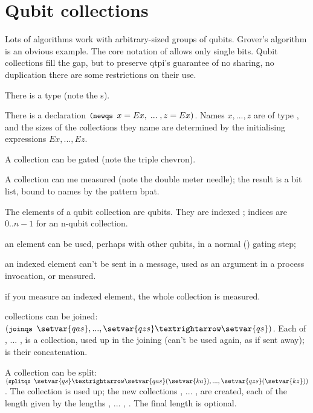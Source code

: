 
\chapter{Qubit collections}

Lots of algorithms work with arbitrary-sized groups of qubits. Grover's algorithm is an obvious example. The core notation of  allows only single bits. Qubit collections fill the gap, but to preserve qtpi's guarantee of no sharing, no duplication there are some restrictions on their use.

\begin{itemize*}
\item There is a type  (note the s).
\item There is a declaration $\texttt{\small{}(newqs } x=Ex, \;...\; ,z=Ex )$. Names $x, ... ,z$ are of type , and the sizes of the collections they name are determined by the initialising expressions $Ex, ..., Ez$.
\item A collection can be gated  (note the triple chevron).
\item A collection can me measured  (note the double meter needle); the result is a bit list, bound to names by the pattern bpat.
\item The elements of a qubit collection are qubits. They are indexed ; indices are $0..n-1$ for an n-qubit collection. 
\begin{itemize*}
\item an element can be used, perhaps with other qubits, in a normal (\verbtt{>>}) gating step;
\item an indexed element can't be sent in a message, used as an argument in a process invocation, or measured.
\item if you measure an indexed element, the whole collection is measured.
\end{itemize*}
\item collections can be joined: $(\verbtt{joinqs } \setvar{qas}, ... , \setvar{qzs} → \setvar{qs})$. Each of , ... ,  is a collection, used up in the joining (can't be used again, as if sent away);  is their concatenation.
\item A collection can be split: $(\verbtt{splitqs } \setvar{qs} → \setvar{qas}(\setvar{ka}), ... , \setvar{qzs}(\setvar{kz}))$. The collection  is used up; the new collections , ... ,  are created, each of the length given by the lengths , ... , . The final length  is optional.
\end{itemize*}

